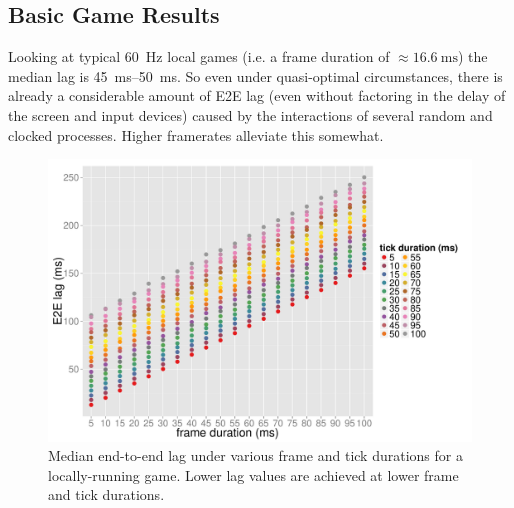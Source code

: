 \subsection{Basic Game Results}



Looking at typical \SI{60}{\hertz} local games (i.e. a frame duration of $\approx \SI{16.6}{\milli\second}$) the median lag is \SIrange{45}{50}{\milli\second}. So even under quasi-optimal circumstances, there is already a considerable amount of \gls{E2E} lag (even without factoring in the delay of the screen and input devices) caused by the interactions of several random and clocked processes. Higher framerates alleviate this somewhat.


\begin{figure}[!t]
	\centering
	\includegraphics[width=1.0\columnwidth]{../../../simulation/visualization/nwless-onlinegame-1000rounds.pdf}
	\caption{Median end-to-end lag under various frame and tick durations for a locally-running game. Lower lag values are achieved at lower frame and tick durations.}
\label{fig:nwless-scatter}
\end{figure}

